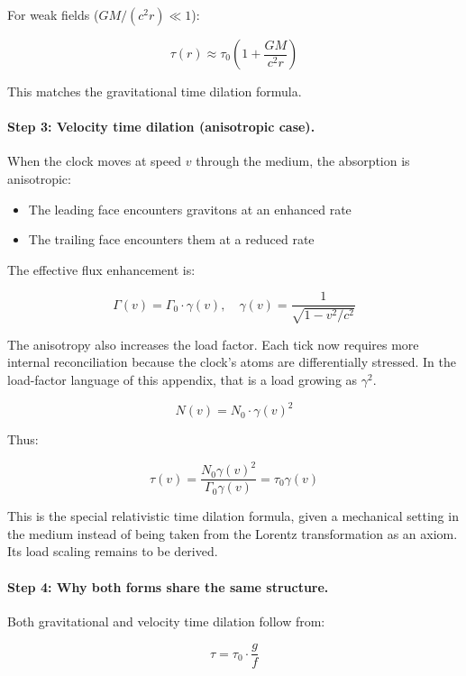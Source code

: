 \documentclass[12pt, a4paper]{article}
\begin{document}
For weak fields (\( GM/(c^2 r) \ll 1 \)):

\[
\tau(r) \approx \tau_0 \left(1 + \frac{GM}{c^2 r}\right)
\]

This matches the gravitational time dilation formula.

\paragraph{Step 3: Velocity time dilation (anisotropic case).}

When the clock moves at speed \( v \) through the medium, the absorption is anisotropic:
\begin{itemize}
    \item The leading face encounters gravitons at an enhanced rate
    \item The trailing face encounters them at a reduced rate
\end{itemize}

The effective flux enhancement is:

\[
\Gamma(v) = \Gamma_0 \cdot \gamma(v), \quad \gamma(v) = \frac{1}{\sqrt{1 - v^2/c^2}}
\]

The anisotropy also increases the load factor. Each tick now requires more internal reconciliation because the clock's atoms are differentially stressed.  In the load-factor language of this appendix, that is a load growing as $\gamma^2$.

\[
N(v) = N_0 \cdot \gamma(v)^2
\]

Thus:

\[
\tau(v) = \frac{N_0 \gamma(v)^2}{\Gamma_0 \gamma(v)} = \tau_0 \gamma(v)
\]

This is the special relativistic time dilation formula, given a mechanical setting in the medium instead of being taken from the Lorentz transformation as an axiom. Its load scaling remains to be derived.

\paragraph{Step 4: Why both forms share the same structure.}

Both gravitational and velocity time dilation follow from:

\[
\tau = \tau_0 \cdot \frac{g}{f}
\]
\end{document}
